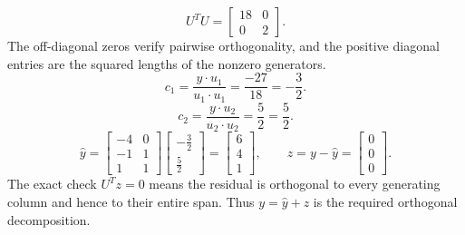 \[U^TU=\left[\begin{array}{rr}18&0\\0&2\end{array}\right].\]
The off-diagonal zeros verify pairwise orthogonality, and the positive diagonal entries are the squared lengths of the nonzero generators.
\[c_{1}=\frac{y\cdot u_{1}}{u_{1}\cdot u_{1}}=\frac{-27}{18}=- \frac{3}{2}.\]
\[c_{2}=\frac{y\cdot u_{2}}{u_{2}\cdot u_{2}}=\frac{5}{2}=\frac{5}{2}.\]
\[\widehat y=\left[\begin{array}{rr}-4&0\\-1&1\\1&1\end{array}\right]\left[\begin{array}{r}- \frac{3}{2}\\\frac{5}{2}\end{array}\right]=\left[\begin{array}{r}6\\4\\1\end{array}\right],\qquad z=y-\widehat y=\left[\begin{array}{r}0\\0\\0\end{array}\right].\]
The exact check $U^Tz=0$ means the residual is orthogonal to every generating column and hence to their entire span. Thus $y=\widehat y+z$ is the required orthogonal decomposition.


